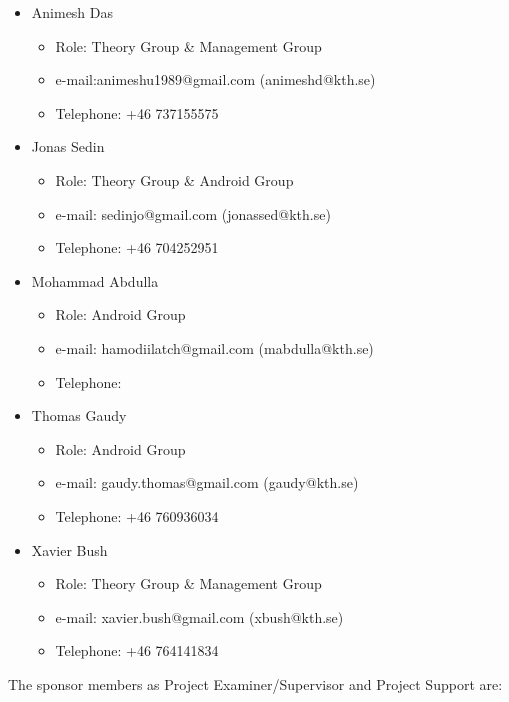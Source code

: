\documentclass[11pt]{article}
\begin{document}
\begin{itemize}

\item Animesh Das
	\begin{itemize}
	\item Role: Theory Group \& Management Group
	\item e-mail:animeshu1989@gmail.com (animeshd@kth.se)
	\item Telephone: +46 737155575
	\end{itemize}
	
\item Jonas Sedin
	\begin{itemize}
	\item Role: Theory Group \& Android Group
	\item e-mail: sedinjo@gmail.com (jonassed@kth.se)
	\item Telephone: +46 704252951
	\end{itemize}
	
\item Mohammad Abdulla
	\begin{itemize}
	\item Role: Android Group
	\item e-mail: hamodiilatch@gmail.com (mabdulla@kth.se)
	\item Telephone: 
	\end{itemize}
	
\item Thomas Gaudy
	\begin{itemize}
	\item Role: Android Group
	\item e-mail: gaudy.thomas@gmail.com (gaudy@kth.se)
	\item Telephone: +46 760936034
	\end{itemize}
	
\item Xavier Bush
	\begin{itemize}
	\item Role: Theory Group \& Management Group
	\item e-mail: xavier.bush@gmail.com (xbush@kth.se)
	\item Telephone: +46 764141834
	\end{itemize}
	
	
\end{itemize}

The sponsor members as Project Examiner/Supervisor and Project Support are:
\end{document}
